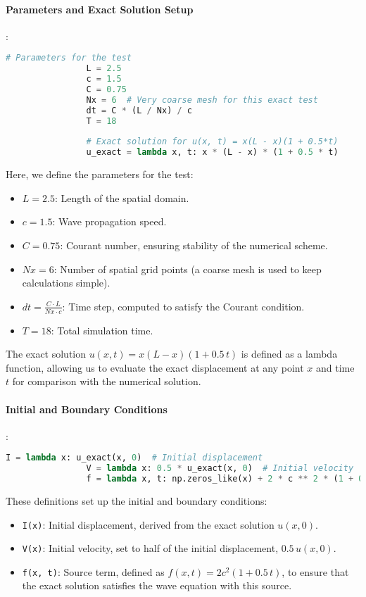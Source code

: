 \documentclass{article}
\begin{document}
			\paragraph{Parameters and Exact Solution Setup}
			:
			\begin{lstlisting}[language=Python]
				# Parameters for the test
				L = 2.5
				c = 1.5
				C = 0.75
				Nx = 6  # Very coarse mesh for this exact test
				dt = C * (L / Nx) / c
				T = 18
				
				# Exact solution for u(x, t) = x(L - x)(1 + 0.5*t)
				u_exact = lambda x, t: x * (L - x) * (1 + 0.5 * t)
			\end{lstlisting}
			Here, we define the parameters for the test:
			\begin{itemize}
				\item \( L = 2.5 \): Length of the spatial domain.
				\item \( c = 1.5 \): Wave propagation speed.
				\item \( C = 0.75 \): Courant number, ensuring stability of the numerical scheme.
				\item \( Nx = 6 \): Number of spatial grid points (a coarse mesh is used to keep calculations simple).
				\item \( dt = \frac{C \cdot L}{Nx \cdot c} \): Time step, computed to satisfy the Courant condition.
				\item \( T = 18 \): Total simulation time.
			\end{itemize}
			
			The exact solution \( u(x, t) = x(L - x)(1 + 0.5 \, t) \) is defined as a lambda function, allowing us to evaluate the exact displacement at any point \( x \) and time \( t \) for comparison with the numerical solution.
			
			\paragraph{Initial and Boundary Conditions}
			:
			\begin{lstlisting}[language=Python]
				I = lambda x: u_exact(x, 0)  # Initial displacement
				V = lambda x: 0.5 * u_exact(x, 0)  # Initial velocity
				f = lambda x, t: np.zeros_like(x) + 2 * c ** 2 * (1 + 0.5 * t)  # Source term
			\end{lstlisting}
			
			These definitions set up the initial and boundary conditions:
			\begin{itemize}
				\item \texttt{I(x)}: Initial displacement, derived from the exact solution \( u(x, 0) \).
				\item \texttt{V(x)}: Initial velocity, set to half of the initial displacement, \( 0.5 \, u(x, 0) \).
				\item \texttt{f(x, t)}: Source term, defined as \( f(x, t) = 2c^2(1 + 0.5 \, t) \), to ensure that the exact solution satisfies the wave equation with this source.
			\end{itemize}
			
\end{document}

